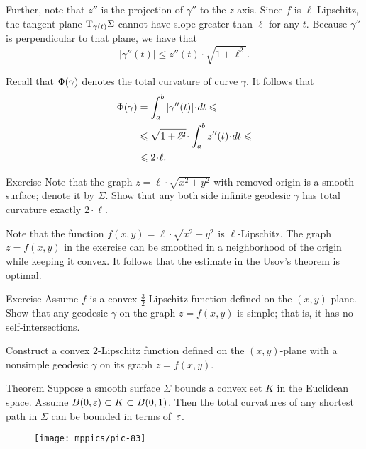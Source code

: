 Further, note that $z''$ is the projection of $\gamma''$ to the $z$-axis.
Since $f$ is $\ell$-Lipschitz, the tangent plane $\mathrm{T}_{\gamma (t)} \Sigma$ cannot have slope greater than $\ell$ for any $t$.
Because $\gamma ''$ is perpendicular to that plane, we have that
\[|\gamma'' (t)|  \le  z''(t)\cdot\sqrt{1+ \ell ^2}.\]

Recall that $\Phi({\gamma})$ denotes the total curvature of curve $\gamma$.
It follows that 
\begin{align*}
\tc\gamma&=\int_a^b|\gamma'' (t)|\cdot dt\le 
\\
&\le \sqrt{1+ \ell ^2}\cdot  \int_a^b z''(t)\cdot dt\le 
\\
&\le 2\cdot \ell.
\end{align*}
\qedsf

\begin{thm}{Exercise}\label{ex:usov-exact}
Note that the graph $z=\ell\cdot\sqrt{x^2+y^2}$ with removed origin is a smooth surface; denote it by $\Sigma$.
Show that any both side infinite geodesic $\gamma$ has total curvature exactly $2\cdot \ell$.
\end{thm}

Note that the function $f(x,y)=\ell\cdot\sqrt{x^2+y^2}$ is $\ell$-Lipschitz.
The graph $z=f(x,y)$ in the exercise can be smoothed in a neighborhood of the origin while keeping it convex.
It follows that the estimate in the Usov's theorem is optimal.


\begin{thm}{Exercise}\label{ex:rough-bound-mountain}
Assume $f$ is a convex $\tfrac32$-Lipschitz function defined on the $(x,y)$-plane.
Show that any geodesic $\gamma$ on the graph $z=f(x,y)$ is simple;
that is, it has no self-intersections.

Construct a convex $2$-Lipschitz function defined on the $(x,y)$-plane
with a nonsimple geodesic $\gamma$ on its graph $z=f(x,y)$.
\end{thm}


\begin{thm}{Theorem}\label{thm:tc-of-mingeod}
Suppose a smooth surface $\Sigma$ bounds a convex set $K$ in the Euclidean space.
Assume $B(0,\varepsilon)\subset K\subset B(0,1)$.
Then the total curvatures of any shortest path in $\Sigma$ can be bounded in terms of~$\varepsilon$. 
\end{thm}

\begin{wrapfigure}{r}{48 mm}
\vskip-4mm
\centering
\texttt{[image: mppics/pic-83]}
\vskip-0mm
\end{wrapfigure}

